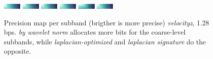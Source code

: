 \begin{figure}[h]
	\centering
	{\includegraphics[width=0.48\linewidth]{img/laplacian/SIG-(GREEDY)-(laplacian)-boiler.png}}
	{\includegraphics[width=0.48\linewidth]{img/laplacian/SIG-(GREEDY)-(laplacian)-diffusivity.png}}
	{\includegraphics[width=0.48\linewidth]{img/laplacian/SIG-(GREEDY)-(laplacian)-velocityz.png}}
	{\includegraphics[width=0.48\linewidth]{img/laplacian/SIG-(GREEDY)-(laplacian)-marschner-lobb.png}}
	{\includegraphics[width=0.48\linewidth]{img/laplacian/SIG-(GREEDY)-(laplacian)-euler.png}}
	{\includegraphics[width=0.48\linewidth]{img/laplacian/SIG-(GREEDY)-(laplacian)-pressure.png}}
	\caption{Precision map per subband (brigther is more precise) \emph{velocityz}, 1.28 bps. \emph{by wavelet norm} allocates more bits for the coarse-level subbands, while \emph{laplacian-optimized} and \emph{laplacian signature} do the opposite.}
	\label{fig:laplacian-precision-comparison}
\end{figure}

